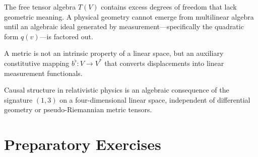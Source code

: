\documentclass[11pt,a4paper]{article}
\begin{document}
\begin{thesis}
  The free tensor algebra $T(V)$ contains excess degrees of freedom that lack
  geometric meaning.
  A physical geometry cannot emerge from multilinear algebra until an
  algebraic ideal generated by measurement---specifically the quadratic form
  $q(v)$---is factored out.
\end{thesis}

\begin{thesis}
  A metric is not an intrinsic property of a linear space, but an auxiliary
  constitutive mapping $b^\flat : V \to V^*$ that converts displacements into
  linear measurement functionals.
\end{thesis}

\begin{thesis}
  Causal structure in relativistic physics is an algebraic consequence of the
  signature $(1, 3)$ on a four-dimensional linear space, independent of
  differential geometry or pseudo-Riemannian metric tensors.
\end{thesis}

\section{Preparatory Exercises}
\label{sec:exercises}
\end{document}
